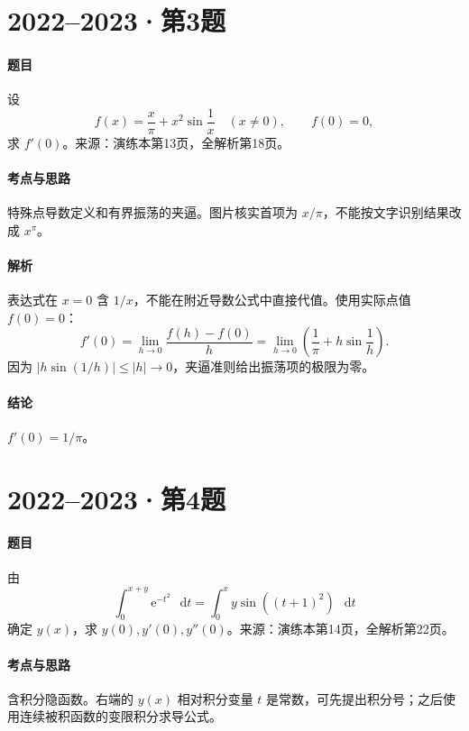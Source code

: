 \documentclass[UTF8,fontset=fandol,12pt,oneside,openany]{ctexrep}
\newcommand{\dd}{\mathop{}\!\mathrm d}
\newcommand{\ee}{\mathrm e}
\theoremstyle{definition}
\begin{document}
\par\addvspace{18pt}\noindent\begin{minipage}{\linewidth}
\section{2022--2023·第3题}
\paragraph{题目}设
\[
 f(x)=\frac{x}{\pi}+x^2\sin\frac1x\quad(x\ne0),\qquad f(0)=0,
\]
求 $f'(0)$。来源：演练本第13页，全解析第18页。
\end{minipage}\par
\paragraph{考点与思路}特殊点导数定义和有界振荡的夹逼。图片核实首项为 $x/\pi$，不能按文字识别结果改成 $x^\pi$。
\paragraph{解析}表达式在 $x=0$ 含 $1/x$，不能在附近导数公式中直接代值。使用实际点值 $f(0)=0$：
\[
 f'(0)=\lim_{h\to0}\frac{f(h)-f(0)}h
 =\lim_{h\to0}\left(\frac1\pi+h\sin\frac1h\right).
\]
因为 $|h\sin(1/h)|\le|h|\to0$，夹逼准则给出振荡项的极限为零。
\paragraph{结论}$f'(0)=1/\pi$。

\par\addvspace{18pt}\noindent\begin{minipage}{\linewidth}
\section{2022--2023·第4题}
\paragraph{题目}由
\[
 \int_0^{x+y}\ee^{-t^2}\,\dd t
 =\int_0^x y\sin((t+1)^2)\,\dd t
\]
确定 $y(x)$，求 $y(0),y'(0),y''(0)$。来源：演练本第14页，全解析第22页。
\end{minipage}\par
\paragraph{考点与思路}含积分隐函数。右端的 $y(x)$ 相对积分变量 $t$ 是常数，可先提出积分号；之后使用连续被积函数的变限积分求导公式。
\end{document}

